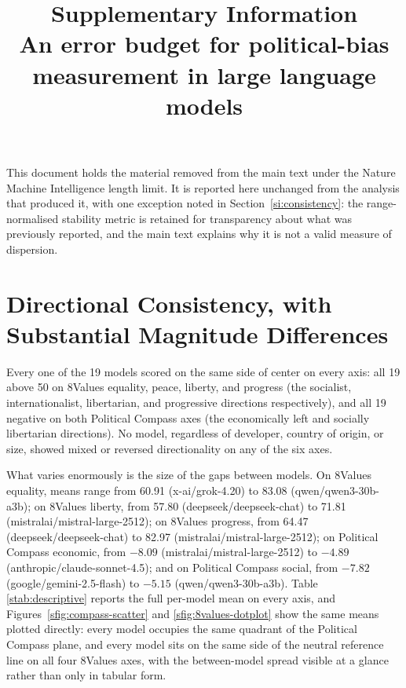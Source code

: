 \documentclass[11pt]{article}
\title{\textbf{Supplementary Information\\
An error budget for political-bias measurement in large language models}}
\author{}
\date{}
\begin{document}
\maketitle
\renewcommand{\thesection}{S\arabic{section}}
\renewcommand{\thetable}{S\arabic{table}}
\renewcommand{\thefigure}{S\arabic{figure}}
\setcounter{section}{0}\setcounter{table}{0}\setcounter{figure}{0}

\noindent This document holds the material removed from the main text under the
Nature Machine Intelligence length limit. It is reported here unchanged from the
analysis that produced it, with one exception noted in Section~\ref{si:consistency}:
the range-normalised stability metric is retained for transparency about what was
previously reported, and the main text explains why it is not a valid measure of
dispersion.

\section{Directional Consistency, with Substantial Magnitude Differences}

Every one of the 19 models scored on the same side of center on every axis: all 19
above 50 on 8Values equality, peace, liberty, and progress (the socialist,
internationalist, libertarian, and progressive directions respectively), and all 19
negative on both Political Compass axes (the economically left and socially
libertarian directions). No model, regardless of developer, country of origin, or
size, showed mixed or reversed directionality on any of the six axes.

What varies enormously is the size of the gaps between models. On 8Values
equality, means range from 60.91 (x-ai/grok-4.20) to 83.08 (qwen/qwen3-30b-a3b); on
8Values liberty, from 57.80 (deepseek/deepseek-chat) to 71.81
(mistralai/mistral-large-2512); on 8Values progress, from 64.47
(deepseek/deepseek-chat) to 82.97 (mistralai/mistral-large-2512); on Political
Compass economic, from $-8.09$ (mistralai/mistral-large-2512) to $-4.89$
(anthropic/claude-sonnet-4.5); and on Political Compass social, from $-7.82$
(google/gemini-2.5-flash) to $-5.15$ (qwen/qwen3-30b-a3b). Table
\ref{stab:descriptive} reports the full per-model mean on every axis, and
Figures~\ref{sfig:compass-scatter} and \ref{sfig:8values-dotplot} show the same
means plotted directly: every model occupies the same quadrant of the
Political Compass plane, and every model sits on the same side of the
neutral reference line on all four 8Values axes, with the between-model
spread visible at a glance rather than only in tabular form.
\end{document}
